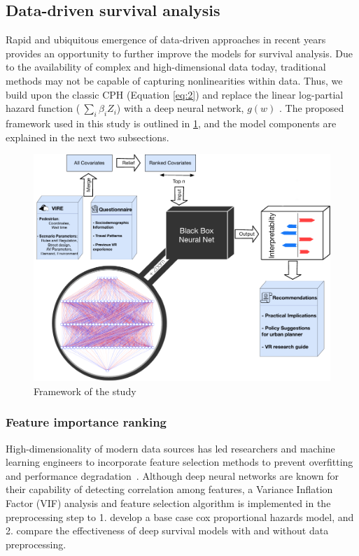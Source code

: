 \subsection{Data-driven survival analysis}
Rapid and ubiquitous emergence of data-driven approaches in recent years provides an opportunity to further improve the models for survival analysis. Due to the availability of complex and high-dimensional data today, traditional methods may not be capable of capturing nonlinearities within data. Thus, we build upon the classic CPH (Equation \ref{eq:2}) and replace the linear log-partial hazard function ($\ \sum_{i}\beta_i Z_i$) with a deep neural network, $g(w)$ \citep{kalatian2019deepwait}. The proposed framework used in this study is outlined in \cref{fig:framework}, and the model components are explained in the next two subsections.

\begin{figure}[!h]
    \centering
    \includegraphics[scale=0.85]{chapter_4/figures/framework.pdf}
    \caption{Framework of the study}
    \label{fig:framework}
\end{figure}

\subsubsection{Feature importance ranking}
High-dimensionality of modern data sources has led researchers and machine learning engineers to incorporate feature selection methods to prevent overfitting and performance degradation~\citep{alelyani2018feature}.  Although deep neural networks are known for their capability of detecting correlation among features, a Variance Inflation Factor (VIF) analysis and feature selection algorithm is implemented in the preprocessing step to 1. develop a base case cox proportional hazards model, and 2. compare the effectiveness of deep survival models with and without data preprocessing.   

